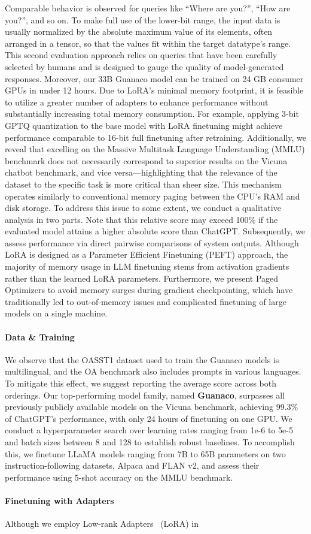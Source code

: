 Comparable behavior is observed for queries like ``Where are you?'', ``How are you?'', and so on. To make full use of the lower-bit range, the input data is usually normalized by the absolute maximum value of its elements, often arranged in a tensor, so that the values fit within the target datatype's range. This second evaluation approach relies on queries that have been carefully selected by humans and is designed to gauge the quality of model-generated responses. Moreover, our 33B {Guanaco} model can be trained on 24 GB consumer GPUs in under 12 hours. Due to LoRA's minimal memory footprint, it is feasible to utilize a greater number of adapters to enhance performance without substantially increasing total memory consumption. For example, applying 3-bit GPTQ quantization to the base model with LoRA finetuning might achieve performance comparable to 16-bit full finetuning after retraining. Additionally, we reveal that excelling on the Massive Multitask Language Understanding (MMLU) benchmark does not necessarily correspond to superior results on the Vicuna chatbot benchmark, and vice versa—highlighting that the relevance of the dataset to the specific task is more critical than sheer size. This mechanism operates similarly to conventional memory paging between the CPU's RAM and disk storage. To address this issue to some extent, we conduct a qualitative analysis in two parts. Note that this relative score may exceed 100\% if the evaluated model attains a higher absolute score than ChatGPT. Subsequently, we assess performance via direct pairwise comparisons of system outputs. Although LoRA is designed as a Parameter Efficient Finetuning (PEFT) approach, the majority of memory usage in LLM finetuning stems from activation gradients rather than the learned LoRA parameters. Furthermore, we present Paged Optimizers to avoid memory surges during gradient checkpointing, which have traditionally led to out-of-memory issues and complicated finetuning of large models on a single machine. \paragraph{Data \& Training} We observe that the OASST1 dataset used to train the {Guanaco} models is multilingual, and the OA benchmark also includes prompts in various languages. To mitigate this effect, we suggest reporting the average score across both orderings. Our top-performing model family, named \textbf{Guanaco}, surpasses all previously publicly available models on the Vicuna benchmark, achieving 99.3\% of ChatGPT's performance, with only 24 hours of finetuning on one GPU. We conduct a hyperparameter search over learning rates ranging from 1e-6 to 5e-5 and batch sizes between 8 and 128 to establish robust baselines. To accomplish this, we finetune LLaMA models ranging from 7B to 65B parameters on two instruction-following datasets, Alpaca and FLAN v2, and assess their performance using 5-shot accuracy on the MMLU benchmark. \paragraph{Finetuning with Adapters} Although we employ Low-rank Adapters~\citep{hu2021lora} (LoRA) in 